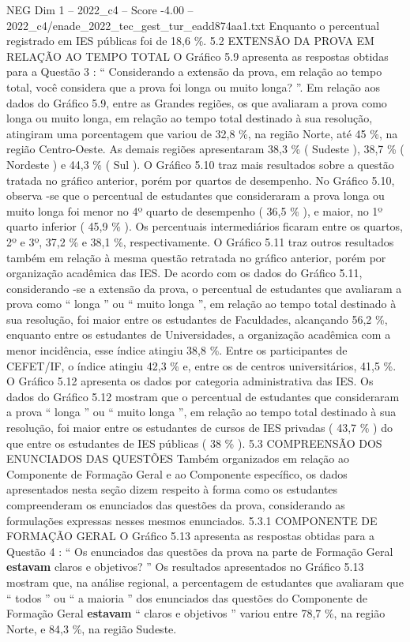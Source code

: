 \begin{textsample}{NEG Dim 1 – 2022\_c4 – Score -4.00 – 2022\_c4/enade\_2022\_tec\_gest\_tur\_eadd874aa1.txt}
Enquanto o percentual registrado em IES públicas foi de 18,6 \%. 5.2 EXTENSÃO DA PROVA EM RELAÇÃO AO TEMPO TOTAL O Gráfico 5.9 apresenta as respostas obtidas para a Questão 3 : “ Considerando a extensão da prova, em relação ao tempo total, você considera que a prova foi longa ou muito longa? ”.
Em relação aos dados do Gráfico 5.9, entre as Grandes regiões, os que avaliaram a prova como longa ou muito longa, em relação ao tempo total destinado à sua resolução, atingiram uma porcentagem que variou de 32,8 \%, na região Norte, até 45 \%, na região Centro-Oeste.
As demais regiões apresentaram 38,3 \% ( Sudeste ), 38,7 \% ( Nordeste ) e 44,3 \% ( Sul ).
O Gráfico 5.10 traz mais resultados sobre a questão tratada no gráfico anterior, porém por quartos de desempenho.
No Gráfico 5.10, observa -se que o percentual de estudantes que consideraram a prova longa ou muito longa foi menor no 4º quarto de desempenho ( 36,5 \% ), e maior, no 1º quarto inferior ( 45,9 \% ).
Os percentuais intermediários ficaram entre os quartos, 2º e 3º, 37,2 \% e 38,1 \%, respectivamente.
O Gráfico 5.11 traz outros resultados também em relação à mesma questão retratada no gráfico anterior, porém por organização acadêmica das IES.
De acordo com os dados do Gráfico 5.11, considerando -se a extensão da prova, o percentual de estudantes que avaliaram a prova como “ longa ” ou “ muito longa ”, em relação ao tempo total destinado à sua resolução, foi maior entre os estudantes de Faculdades, alcançando 56,2 \%, enquanto entre os estudantes de Universidades, a organização acadêmica com a menor incidência, esse índice atingiu 38,8 \%.
Entre os participantes de CEFET/IF, o índice atingiu 42,3 \% e, entre os de centros universitários, 41,5 \%.
O Gráfico 5.12 apresenta os dados por categoria administrativa das IES.
Os dados do Gráfico 5.12 mostram que o percentual de estudantes que consideraram a prova “ longa ” ou “ muito longa ”, em relação ao tempo total destinado à sua resolução, foi maior entre os estudantes de cursos de IES privadas ( 43,7 \% ) do que entre os estudantes de IES públicas ( 38 \% ). 5.3 COMPREENSÃO DOS ENUNCIADOS DAS QUESTÕES Também organizados em relação ao Componente de Formação Geral e ao Componente específico, os dados apresentados nesta seção dizem respeito à forma como os estudantes compreenderam os enunciados das questões da prova, considerando as formulações expressas nesses mesmos enunciados. 5.3.1 COMPONENTE DE FORMAÇÃO GERAL O Gráfico 5.13 apresenta as respostas obtidas para a Questão 4 : “ Os enunciados das questões da prova na parte de Formação Geral \textbf{estavam} claros e objetivos? ” Os resultados apresentados no Gráfico 5.13 mostram que, na análise regional, a percentagem de estudantes que avaliaram que “ todos ” ou “ a maioria ” dos enunciados das questões do Componente de Formação Geral \textbf{estavam} “ claros e objetivos ” variou entre 78,7 \%, na região Norte, e 84,3 \%, na região Sudeste.

\end{textsample}
